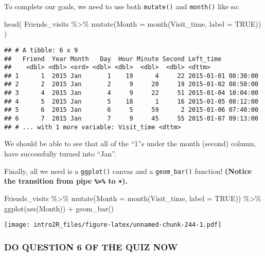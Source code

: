 \documentclass[
]{book}
\newenvironment{Shaded}{\begin{snugshade}}{\end{snugshade}}
\newcommand{\AttributeTok}[1]{\textcolor[rgb]{0.77,0.63,0.00}{#1}}
\newcommand{\ConstantTok}[1]{\textcolor[rgb]{0.00,0.00,0.00}{#1}}
\newcommand{\FunctionTok}[1]{\textcolor[rgb]{0.00,0.00,0.00}{#1}}
\newcommand{\NormalTok}[1]{#1}
\newcommand{\SpecialCharTok}[1]{\textcolor[rgb]{0.00,0.00,0.00}{#1}}
\begin{document}
To complete our goals, we need to use both \texttt{mutate()} and \texttt{month()} like so:

\begin{Shaded}
\begin{Highlighting}[]
\FunctionTok{head}\NormalTok{(}
\NormalTok{Friends\_visits }\SpecialCharTok{\%\textgreater{}\%}
    \FunctionTok{mutate}\NormalTok{(}\AttributeTok{Month =} \FunctionTok{month}\NormalTok{(Visit\_time, }\AttributeTok{label =} \ConstantTok{TRUE}\NormalTok{))}
\NormalTok{    )}
\end{Highlighting}
\end{Shaded}

\begin{verbatim}
## # A tibble: 6 x 9
##   Friend  Year Month   Day  Hour Minute Second Left_time
##    <dbl> <dbl> <ord> <dbl> <dbl>  <dbl>  <dbl> <dttm>
## 1      1  2015 Jan       1    19      4     22 2015-01-01 08:30:00
## 2      2  2015 Jan       2     9     20     19 2015-01-02 08:50:00
## 3      4  2015 Jan       4     9     22     51 2015-01-04 10:04:00
## 4      5  2015 Jan       5    18      1     16 2015-01-05 08:12:00
## 5      6  2015 Jan       6     5     59      2 2015-01-06 07:40:00
## 6      7  2015 Jan       7     9     45     55 2015-01-07 09:13:00
## # ... with 1 more variable: Visit_time <dttm>
\end{verbatim}

We should be able to see that all of the ``1''s under the month (second) column, have successfully turned into ``Jan''.

Finally, all we need is a \texttt{ggplot()} canvas and a \texttt{geom\_bar()} function! \textbf{(Notice the transition from pipe \texttt{\%\textgreater{}\%} to \texttt{+}).}

\begin{Shaded}
\begin{Highlighting}[]
\NormalTok{Friends\_visits }\SpecialCharTok{\%\textgreater{}\%}
    \FunctionTok{mutate}\NormalTok{(}\AttributeTok{Month =} \FunctionTok{month}\NormalTok{(Visit\_time, }\AttributeTok{label =} \ConstantTok{TRUE}\NormalTok{)) }\SpecialCharTok{\%\textgreater{}\%}
    \FunctionTok{ggplot}\NormalTok{(}\FunctionTok{aes}\NormalTok{(Month)) }\SpecialCharTok{+}
    \FunctionTok{geom\_bar}\NormalTok{()}
\end{Highlighting}
\end{Shaded}

\texttt{[image: intro2R\_files/figure-latex/unnamed-chunk-244-1.pdf]}

\hypertarget{do-question-6-of-the-quiz-now-2}{%
\subsubsection{DO QUESTION 6 OF THE QUIZ NOW}\label{do-question-6-of-the-quiz-now-2}}
\end{document}
